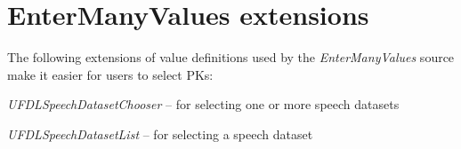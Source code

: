 \documentclass[a4paper]{book}
\begin{document}
\section{EnterManyValues extensions}
The following extensions of value definitions used by the \textit{EnterManyValues}
source make it easier for users to select PKs:
\begin{tight_itemize}
  \item \textit{UFDLSpeechDatasetChooser} -- for selecting one or more speech datasets
  \item \textit{UFDLSpeechDatasetList} -- for selecting a speech dataset
\end{tight_itemize}


\end{document}
